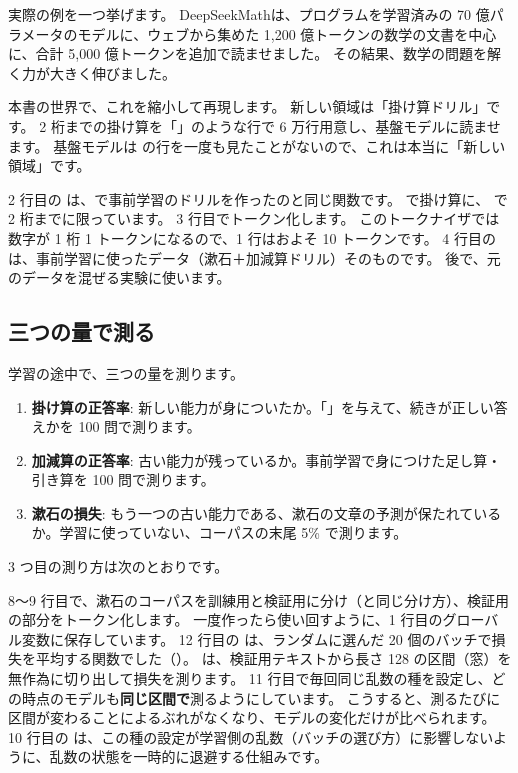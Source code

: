 実際の例を一つ挙げます。
DeepSeekMath\cite{shao2024deepseekmath}は、プログラムを学習済みの 70 億パラメータのモデルに、ウェブから集めた 1,200 億トークンの数学の文書を中心に、合計 5,000 億トークンを追加で読ませました。
その結果、数学の問題を解く力が大きく伸びました。

本書の世界で、これを縮小して再現します。
新しい領域は「掛け算ドリル」です。
2 桁までの掛け算を「」のような行で 6 万行用意し、基盤モデルに読ませます。
基盤モデルは \code{*} の行を一度も見たことがないので、これは本当に「新しい領域」です。


2 行目の  は、で事前学習のドリルを作ったのと同じ関数です。
 で掛け算に、 で 2 桁までに限っています。
3 行目でトークン化します。
このトークナイザでは数字が 1 桁 1 トークンになるので、1 行はおよそ 10 トークンです。
4 行目の  は、事前学習に使ったデータ（漱石＋加減算ドリル）そのものです。
後で、元のデータを混ぜる実験に使います。

\subsection{三つの量で測る}

学習の途中で、三つの量を測ります。

\begin{enumerate}
\item \textbf{掛け算の正答率}: 新しい能力が身についたか。「」を与えて、続きが正しい答えかを 100 問で測ります。
\item \textbf{加減算の正答率}: 古い能力が残っているか。事前学習で身につけた足し算・引き算を 100 問で測ります。
\item \textbf{漱石の損失}: もう一つの古い能力である、漱石の文章の予測が保たれているか。学習に使っていない、コーパスの末尾 5\% で測ります。
\end{enumerate}

3 つ目の測り方は次のとおりです。


8〜9 行目で、漱石のコーパスを訓練用と検証用に分け（と同じ分け方）、検証用の部分をトークン化します。
一度作ったら使い回すように、1 行目のグローバル変数に保存しています。
12 行目の  は、ランダムに選んだ 20 個のバッチで損失を平均する関数でした（）。
 は、検証用テキストから長さ 128 の区間（窓）を無作為に切り出して損失を測ります。
11 行目で毎回同じ乱数の種を設定し、どの時点のモデルも\textbf{同じ区間で}測るようにしています。
こうすると、測るたびに区間が変わることによるぶれがなくなり、モデルの変化だけが比べられます。
10 行目の  は、この種の設定が学習側の乱数（バッチの選び方）に影響しないように、乱数の状態を一時的に退避する仕組みです。

